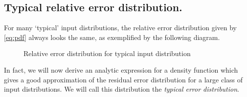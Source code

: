 \documentclass[10pt,a4paper]{article}
\theoremstyle{plain}
\theoremstyle{definition}
\begin{document}
\subsection{Typical relative error distribution.}

For many `typical' input distributions, the relative error distribution given by \eqref{eq:pdf}  always looks the same, as exemplified by the following diagram.

\begin{figure}
\caption{Relative error distribution for typical input distribution}
\label{fig:errdist}
\end{figure}

In fact, we will now derive an analytic expression for a density function which gives a good approximation of the residual error distribution for a large class of input distributions. We will call this distribution the \emph{typical error distribution}.
\end{document}

